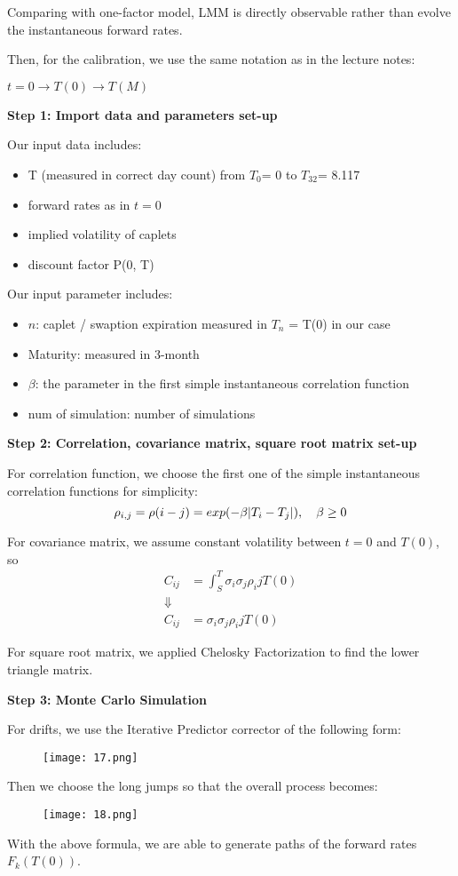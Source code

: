 \documentclass[paper = letterpaper, fontsize=12pt]{article}
\begin{document}
Comparing with one-factor model, LMM is directly observable rather than evolve the instantaneous forward rates.

Then, for the calibration, we use the same notation as in the lecture notes:

$t = 0   \rightarrow T(0) \rightarrow T(M)$

\large
\textbf{Step 1:  Import data and parameters set-up}
\normalsize

  Our input data includes: 
\begin{itemize}
\item T (measured in correct day count) from $T_0$= 0  to $T_{32}$= 8.117
\item forward rates as in $t = 0$
\item implied volatility of caplets
\item discount factor P(0, T)
\end{itemize}

Our input parameter includes:
\begin{itemize}
\item $n$: caplet / swaption expiration measured in $T_n$ = T(0) in our case
\item Maturity: measured in 3-month
\item $\beta$: the parameter in the first simple instantaneous correlation function
\item num of simulation: number of simulations
\end{itemize}
\large

\textbf{Step 2: Correlation, covariance matrix, square root matrix set-up}

\normalsize
For correlation function, we choose the first one of the simple instantaneous correlation functions for simplicity:
\[
\rho_{i,j} = \rho(i - j) = exp(-\beta\arrowvert T_i - T_j\arrowvert), \quad \beta \ge 0
\]
 
For covariance matrix, we assume constant volatility between $t = 0$ and $T(0)$, so
\begin{align*}
C_{ij} &= \int_S^T \sigma_i \sigma_j \rho_ij T(0)\\
\Downarrow\\
C_{ij} &= \sigma_i \sigma_j \rho_ij T(0)
\end{align*}

For square root matrix, we applied Chelosky Factorization to find the lower triangle matrix.

\large
\textbf{Step 3: Monte Carlo Simulation}

\normalsize
For drifts, we use the Iterative Predictor corrector of the following form:
\begin{figure}[H]
    \centering
    \texttt{[image: 17.png]}
\end{figure}
Then we choose the long jumps so that the overall process becomes:
 \begin{figure}[H]
     \centering
     \texttt{[image: 18.png]}
 \end{figure}
With the above formula, we are able to generate paths of the forward rates $F_k (T(0))$.
\end{document}
